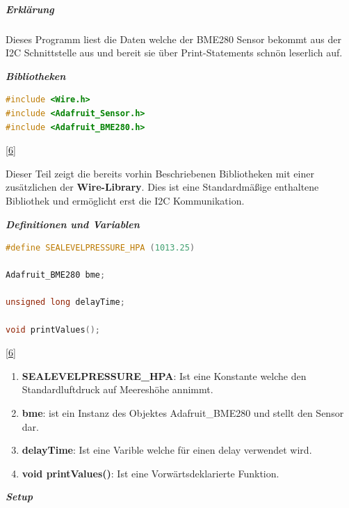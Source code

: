 \documentclass[
    headings=optiontotocandhead,%
    twoside,
    numbers=noenddot,%
    12pt, %
    titlepage, %
    parskip=full, %
    listof=leveldown, 
    numbers=noenddot, %
    a4paper,DIV=14,
    BCOR=15mm,
]{scrbook}
\providecommand{\tightlist}{%
  \setlength{\itemsep}{0pt}\setlength{\parskip}{0pt}}
\begin{document}
\hypertarget{erkluxe4rung}{%
\subparagraph{Erklärung}\label{erkluxe4rung}}

Dieses Programm liest die Daten welche der BME280 Sensor bekommt aus der
I2C Schnittstelle aus und bereit sie über Print-Statements schnön
leserlich auf.

\textbf{\emph{Bibliotheken}}

\begin{lstlisting}[language={C++}, caption={Dependencies BME}]
#include <Wire.h>
#include <Adafruit_Sensor.h>
#include <Adafruit_BME280.h>
\end{lstlisting}

{[}\protect\hyperlink{ref-BME280-Test}{6}{]}

Dieser Teil zeigt die bereits vorhin Beschriebenen Bibliotheken mit
einer zusätzlichen der \textbf{Wire-Library}. Dies ist eine
Standardmäßige enthaltene Bibliothek und ermöglicht erst die I2C
Kommunikation.

\textbf{\emph{Definitionen und Variablen}}

\begin{lstlisting}[language={C++}, caption={Definition und Variablen BME}]
#define SEALEVELPRESSURE_HPA (1013.25)

Adafruit_BME280 bme; 

unsigned long delayTime;

void printValues();
\end{lstlisting}

{[}\protect\hyperlink{ref-BME280-Test}{6}{]}

\begin{enumerate}
\def\labelenumi{\arabic{enumi}.}
\tightlist
\item
  \textbf{SEALEVELPRESSURE\_HPA}: Ist eine Konstante welche den
  Standardluftdruck auf Meereshöhe annimmt.
\item
  \textbf{bme}: ist ein Instanz des Objektes Adafruit\_BME280 und stellt
  den Sensor dar.
\item
  \textbf{delayTime}: Ist eine Varible welche für einen delay verwendet
  wird.
\item
  \textbf{void printValues()}: Ist eine Vorwärtsdeklarierte Funktion.
\end{enumerate}

\textbf{\emph{Setup}}
\end{document}
